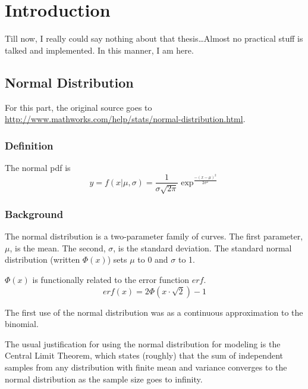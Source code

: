 \documentclass{article}
\begin{document}

\section{Introduction}
\label{sec:introduction}

Till now, I really could say nothing about that thesis\ldots Almost no
practical stuff is talked and implemented. In this manner, I am here.


\subsection{Normal Distribution}
\label{sec:normal-distribution}

For this part, the original source goes to
\url{http://www.mathworks.com/help/stats/normal-distribution.html}. 
\subsubsection{Definition}
\label{sec:definition}

The normal pdf is
\begin{equation}
  \label{eq:1}
  y=f(x|\mu,\sigma)=\frac{1}{\sigma\sqrt{2\pi}}\exp^{\frac{-{(x-\mu)}^{2}}{2\sigma^{2}}}
\end{equation}

\subsubsection{Background}
\label{sec:background}

The normal distribution is a two-parameter family of curves. The first
parameter, $\mu$, is the mean. The second, $\sigma$, is the standard
deviation. The standard normal distribution (written $\Phi(x)$) sets
$\mu$ to 0 and $\sigma$ to 1. 
\par
$\Phi(x)$ is functionally related to the error function $erf$.
\begin{equation}
  \label{eq:2}
  erf(x)=2\Phi(x\cdot\sqrt{2})-1
\end{equation}
\par
The first use of the normal distribution was as a continuous
approximation to the binomial. 
\par
The usual justification for using the normal distribution for modeling
is the Central Limit Theorem, which states (roughly) that the sum of
independent samples from any distribution with finite mean and
variance converges to the normal distribution as the sample size goes
to infinity. 
\end{document}
